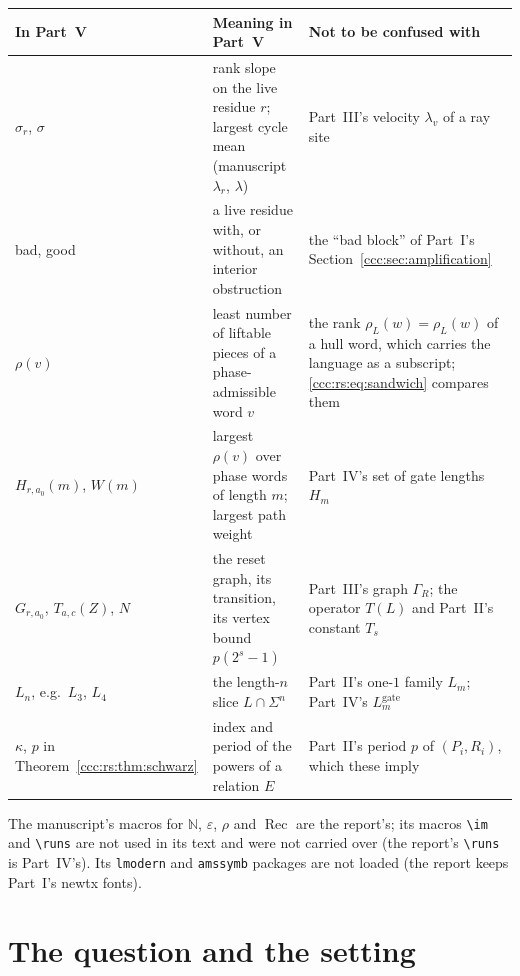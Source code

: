 \documentclass[11pt,letterpaper]{article}
\theoremstyle{definition}
\theoremstyle{remark}
\newcommand{\N}{\mathbb N}
\newcommand{\eps}{\varepsilon}
\newcommand{\rec}{\operatorname{Rec}}
\newcommand{\rank}{\rho}
\newcommand{\runs}{\operatorname{runs}}
\newcommand{\Lgate}[1]{L^{\mathrm{gate}}_{#1}}
\begin{document}
\begin{center}\small
\begin{tabular}{@{}>{\raggedright\arraybackslash}p{}>{\raggedright\arraybackslash}p{}>{\raggedright\arraybackslash}p{}@{}}
\toprule
\textbf{In Part~V} & \textbf{Meaning in Part~V} & \textbf{Not to be confused with}\\
\midrule
$\sigma_r$, $\sigma$ & rank slope on the live residue $r$; largest cycle mean (manuscript $\lambda_r$, $\lambda$) & Part~III's velocity $\lambda_v$ of a ray site\\[3pt]
bad, good & a live residue with, or without, an interior obstruction & the ``bad block'' of Part~I's Section~\ref{ccc:sec:amplification}\\[3pt]
$\rho(v)$ & least number of liftable pieces of a phase-admissible word $v$ & the rank $\rank_L(w)=\rho_L(w)$ of a hull word, which carries the language as a subscript; \eqref{ccc:rs:eq:sandwich} compares them\\[3pt]
$H_{r,a_0}(m)$, $W(m)$ & largest $\rho(v)$ over phase words of length $m$; largest path weight & Part~IV's set of gate lengths $H_m$\\[3pt]
$G_{r,a_0}$, $T_{a,c}(Z)$, $N$ & the reset graph, its transition, its vertex bound $p(2^s-1)$ & Part~III's graph $\Gamma_R$; the operator $T(L)$ and Part~II's constant $T_s$\\[3pt]
$L_n$, e.g.\ $L_3$, $L_4$ & the length-$n$ slice $L\cap\Sigma^n$ & Part~II's one-$1$ family $L_m$; Part~IV's $\Lgate m$\\[3pt]
$\kappa$, $p$ in Theorem~\ref{ccc:rs:thm:schwarz} & index and period of the powers of a relation $E$ & Part~II's period $p$ of $(P_i,R_i)$, which these imply\\
\bottomrule
\end{tabular}
\end{center}

The manuscript's macros for $\N$, $\eps$, $\rank$ and $\rec$ are the
report's; its macros \verb|\im| and \verb|\runs| are not used in its text and were
not carried over (the report's \verb|\runs| is Part~IV's). Its
\texttt{lmodern} and \texttt{amssymb} packages are not loaded (the report
keeps Part~I's newtx fonts).

\section{The question and the setting}\label{ccc:rs:sec:setting}
\end{document}
